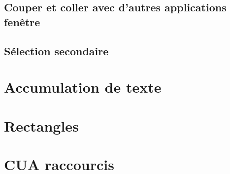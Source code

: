 \subsection{Couper et coller avec d'autres applications
  fenêtre}\label{chap9sec3subsec1} 
\subsection{Sélection secondaire}\label{chap9sec3subsec2}
\section{Accumulation de texte}\label{chap9sec3subsec3}
\section{Rectangles}\label{chap9sec3subsec4}
\section{CUA raccourcis}\label{chap9sec3subsec5}
